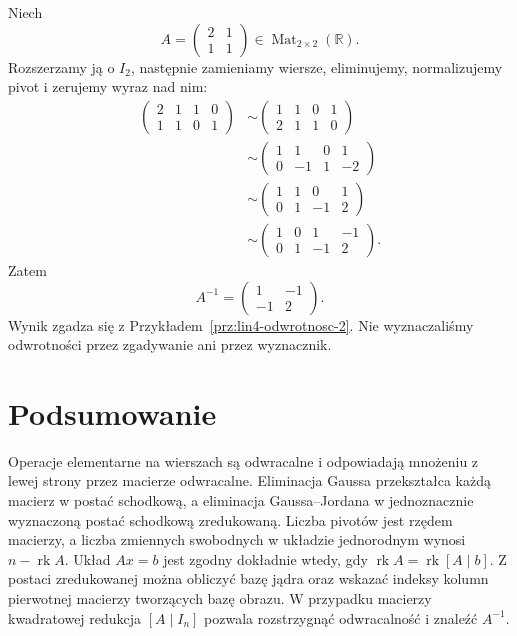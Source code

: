 \begin{przyklad}
\label{prz:lin5-odwrotnosc}
Niech
\[
 A=\begin{pmatrix}2&1\\1&1\end{pmatrix}
 \in\operatorname{Mat}_{2\times2}(\mathbb R).
\]
Rozszerzamy ją o \(I_2\), następnie
zamieniamy wiersze, eliminujemy,
normalizujemy pivot i zerujemy wyraz nad nim:
\[
\begin{aligned}
\left(\begin{array}{rr|rr}2&1&1&0\\1&1&0&1\end{array}\right)
&\sim
\left(\begin{array}{rr|rr}1&1&0&1\\2&1&1&0\end{array}\right)\\
&\sim
\left(\begin{array}{rr|rr}1&1&0&1\\0&-1&1&-2\end{array}\right)\\
&\sim
\left(\begin{array}{rr|rr}1&1&0&1\\0&1&-1&2\end{array}\right)\\
&\sim
\left(\begin{array}{rr|rr}1&0&1&-1\\0&1&-1&2\end{array}\right).
\end{aligned}
\]
Zatem
\[
 A^{-1}=\begin{pmatrix}1&-1\\-1&2\end{pmatrix}.
\]
Wynik zgadza się z
Przykładem~\ref{prz:lin4-odwrotnosc-2}.
Nie wyznaczaliśmy odwrotności
przez zgadywanie ani przez wyznacznik.
\end{przyklad}

\section{Podsumowanie}
\label{sec:lin5-podsumowanie}

Operacje elementarne na wierszach są
odwracalne i odpowiadają mnożeniu
z lewej strony przez macierze odwracalne.
Eliminacja Gaussa przekształca każdą macierz
w postać schodkową, a eliminacja
Gaussa--Jordana w jednoznacznie wyznaczoną
postać schodkową zredukowaną.
Liczba pivotów jest rzędem macierzy,
a liczba zmiennych swobodnych
w układzie jednorodnym wynosi
\(n-\operatorname{rk}A\).
Układ \(Ax=b\) jest zgodny dokładnie wtedy,
gdy \(\operatorname{rk}A=\operatorname{rk}[A\mid b]\).
Z postaci zredukowanej można obliczyć
bazę jądra oraz wskazać indeksy kolumn
pierwotnej macierzy tworzących bazę obrazu.
W przypadku macierzy kwadratowej
redukcja \([A\mid I_n]\) pozwala
rozstrzygnąć odwracalność i znaleźć \(A^{-1}\).
